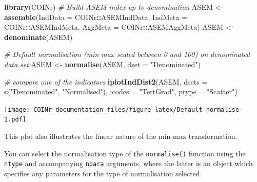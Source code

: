 \documentclass[
]{book}
\newenvironment{Shaded}{\begin{snugshade}}{\end{snugshade}}
\newcommand{\CommentTok}[1]{\textcolor[rgb]{0.56,0.35,0.01}{\textit{#1}}}
\newcommand{\DataTypeTok}[1]{\textcolor[rgb]{0.13,0.29,0.53}{#1}}
\newcommand{\KeywordTok}[1]{\textcolor[rgb]{0.13,0.29,0.53}{\textbf{#1}}}
\newcommand{\NormalTok}[1]{#1}
\newcommand{\OperatorTok}[1]{\textcolor[rgb]{0.81,0.36,0.00}{\textbf{#1}}}
\newcommand{\StringTok}[1]{\textcolor[rgb]{0.31,0.60,0.02}{#1}}
\begin{document}
\begin{Shaded}
\begin{Highlighting}[]
\KeywordTok{library}\NormalTok{(COINr)}
\CommentTok{# Build ASEM index up to denomination}
\NormalTok{ASEM <-}\StringTok{ }\KeywordTok{assemble}\NormalTok{(}\DataTypeTok{IndData =}\NormalTok{ COINr}\OperatorTok{::}\NormalTok{ASEMIndData, }\DataTypeTok{IndMeta =}\NormalTok{ COINr}\OperatorTok{::}\NormalTok{ASEMIndMeta, }\DataTypeTok{AggMeta =}\NormalTok{ COINr}\OperatorTok{::}\NormalTok{ASEMAggMeta)}
\NormalTok{ASEM <-}\StringTok{ }\KeywordTok{denominate}\NormalTok{(ASEM)}

\CommentTok{# Default normalisation (min max scaled between 0 and 100) on denominated data set}
\NormalTok{ASEM <-}\StringTok{ }\KeywordTok{normalise}\NormalTok{(ASEM, }\DataTypeTok{dset =} \StringTok{"Denominated"}\NormalTok{)}

\CommentTok{# compare one of the indicators}
\KeywordTok{iplotIndDist2}\NormalTok{(ASEM, }\DataTypeTok{dsets =} \KeywordTok{c}\NormalTok{(}\StringTok{"Denominated"}\NormalTok{, }\StringTok{"Normalised"}\NormalTok{),}
              \DataTypeTok{icodes =} \StringTok{"TertGrad"}\NormalTok{, }\DataTypeTok{ptype =} \StringTok{"Scatter"}\NormalTok{)}
\end{Highlighting}
\end{Shaded}

\texttt{[image: COINr-documentation\_files/figure-latex/Default normalise-1.pdf]}

This plot also illustrates the linear nature of the min-max transformation.

You can select the normalisation type of the \texttt{normalise()} function using the \texttt{ntype} and accompanying \texttt{npara} arguments, where the latter is an object which specifies any parameters for the type of normalisation selected.
\end{document}
